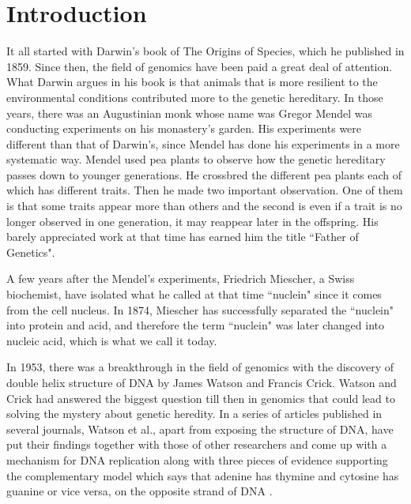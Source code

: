 \chapter{Introduction}

It all started with Darwin's book of The Origins of Species, which he published in 1859. Since then, the field of genomics have been paid a great deal of attention. What Darwin argues in his book is that animals that is more resilient to the environmental conditions contributed more to the genetic hereditary. In those years, there was an Augustinian monk whose name was Gregor Mendel was conducting experiments on his monastery's garden. His experiments were different than that of Darwin's, since Mendel has done his experiments in a more systematic way. Mendel used pea plants to observe how the genetic hereditary passes down to younger generations. He crossbred the different pea plants each of which has different traits. Then he made two important observation. One of them is that some traits appear more than others and the second is even if a trait is no longer observed in one generation, it may reappear later in the offspring. His barely appreciated work at that time has earned him the title ``Father of Genetics".

A few years after the Mendel's experiments, Friedrich Miescher, a Swiss biochemist, have isolated what he called at that time ``nuclein" since it comes from the cell nucleus. In 1874, Miescher has successfully separated the ``nuclein" into protein and acid, and therefore the term ``nuclein" was later changed into nucleic acid, which is what we call it today\cite{pray2008discovery}.

In 1953, there was a breakthrough in the field of genomics with the discovery of double helix structure of DNA by James Watson and Francis Crick. Watson and Crick had answered the biggest question till then in genomics that could lead to solving the mystery about genetic heredity. In a series of articles published in several journals, Watson et al., apart from exposing the structure of DNA, have put their findings together with those of other researchers and come up with a mechanism for DNA replication along with three pieces of evidence supporting the complementary model which says that adenine has thymine and cytosine has guanine or vice versa, on the opposite strand of DNA \cite{watson1953structure}.

